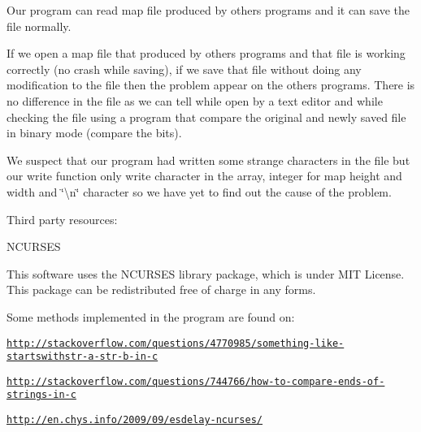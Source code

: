 Our program can read map file produced by others programs and it can save the file normally.

If we open a map file that produced by others programs and that file is working correctly (no crash while saving), if we save that file without doing any modification to the file then the problem appear on the others programs. There is no difference in the file as we can tell while open by a text editor and while checking the file using a program that compare the original and newly saved file in binary mode (compare the bits).

We suspect that our program had written some strange characters in the file but our write function only write character in the array, integer for map height and width and \char`\"{}\textbackslash{}n\char`\"{} character so we have yet to find out the cause of the problem.

Third party resources\-:

N\-C\-U\-R\-S\-E\-S

This software uses the N\-C\-U\-R\-S\-E\-S library package, which is under M\-I\-T License. This package can be redistributed free of charge in any forms.

Some methods implemented in the program are found on\-:

\href{http://stackoverflow.com/questions/4770985/something-like-startswithstr-a-str-b-in-c}{\tt http\-://stackoverflow.\-com/questions/4770985/something-\/like-\/startswithstr-\/a-\/str-\/b-\/in-\/c}

\href{http://stackoverflow.com/questions/744766/how-to-compare-ends-of-strings-in-c}{\tt http\-://stackoverflow.\-com/questions/744766/how-\/to-\/compare-\/ends-\/of-\/strings-\/in-\/c}

\href{http://en.chys.info/2009/09/esdelay-ncurses/}{\tt http\-://en.\-chys.\-info/2009/09/esdelay-\/ncurses/} 